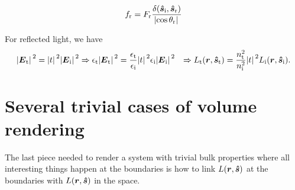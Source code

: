 \documentclass[hyperref, a4paper]{article}
\def\\{}%
\begin{document}
\begin{equation}
    f_{\text{r}} = F_{\text{r}} \frac{\delta(\vu*{s}_\text{i}, \vu*{s}_{\text{r}})}{\abs*{\cos \theta_{\text{r}}}}
\end{equation}

For reflected light, we have 
\begin{equation}
    \begin{aligned}
        \abs*{\vb*{E}_{\text{t}}}^2 = \abs*{t}^2 \abs*{\vb*{E}_{\text{i}}}^2 
        &\Rightarrow \epsilon_{\text{t}} \abs*{\vb*{E}_{\text{t}}}^2 
        = \frac{\epsilon_{\text{t}}}{\epsilon_{\text{i}}} \abs*{t}^2 \epsilon_{\text{i}} \abs*{\vb*{E}_{\text{i}}}^2 \\
        &\Rightarrow L_{\text{t}}(\vb*{r}, \vu*{s}_{\text{t}}) 
        = \frac{n_{\text{t}}^2}{n_{\text{i}}^2} \abs*{t}^2 L_{\text{i}}(\vb*{r}, \vu*{s}_{\text{i}}).
    \end{aligned}
\end{equation}

\section{Several trivial cases of volume rendering}

The last piece needed to render a system with trivial bulk properties 
where all interesting things happen at the boundaries 
is how to link $L(\vb*{r}, \vu*{s})$ at the boundaries 
with $L(\vb*{r}, \vu*{s})$ in the space. 
\end{document}
